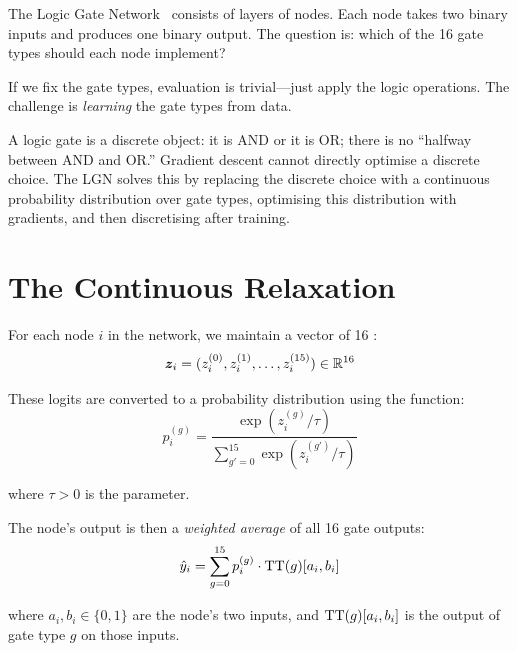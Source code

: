 The Logic Gate Network~\cite{petersen2022difflogic,petersen2024difflogic} consists of layers of nodes. Each node takes
two binary inputs and produces one binary output. The question is:
which of the 16 gate types should each node implement?

If we fix the gate types, evaluation is trivial---just apply the logic
operations. The challenge is \emph{learning} the gate types from data.

\begin{keyinsight}
A logic gate is a discrete object: it is AND or it is OR; there is no
``halfway between AND and OR.'' Gradient descent cannot directly
optimise a discrete choice. The LGN solves this by replacing the
discrete choice with a continuous probability distribution over gate
types, optimising this distribution with gradients, and then
discretising after training.
\end{keyinsight}


\section{The Continuous Relaxation}
\label{sec:relaxation}

For each node $i$ in the network, we maintain a vector of 16
:
\begin{equation}
  \bm{z}_i = (z_i^{(0)}, z_i^{(1)}, \ldots, z_i^{(15)})
    \in \mathbb{R}^{16}
  \label{eq:logits}
\end{equation}

These logits are converted to a probability distribution using the
 function:
\begin{equation}
  p_i^{(g)} = \frac{\exp(z_i^{(g)} / \tau)}
    {\sum_{g'=0}^{15} \exp(z_i^{(g')} / \tau)}
  \label{eq:softmax-gate}
\end{equation}

where $\tau > 0$ is the  parameter.

The node's output is then a \emph{weighted average} of all 16 gate
outputs:
\begin{equation}
  \hat{y}_i = \sum_{g=0}^{15} p_i^{(g)} \cdot \operatorname{TT}(g)[a_i, b_i]
  \label{eq:relaxed-output}
\end{equation}

where $a_i, b_i \in \{0, 1\}$ are the node's two inputs, and
$\operatorname{TT}(g)[a_i, b_i]$ is the output of gate type $g$ on those
inputs.

